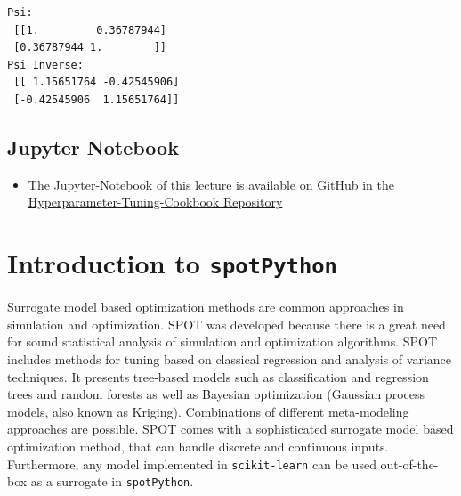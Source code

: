 \documentclass[
  letterpaper,
  DIV=11,
  numbers=noendperiod]{scrreprt}
\providecommand{\tightlist}{%
  \setlength{\itemsep}{0pt}\setlength{\parskip}{0pt}}\usepackage{longtable,booktabs,array}
\begin{document}
\begin{verbatim}
Psi:
 [[1.         0.36787944]
 [0.36787944 1.        ]]
Psi Inverse:
 [[ 1.15651764 -0.42545906]
 [-0.42545906  1.15651764]]
\end{verbatim}

\section{Jupyter Notebook}\label{jupyter-notebook-5}

\begin{tcolorbox}[enhanced jigsaw, left=2mm, opacitybacktitle=0.6, leftrule=.75mm, toptitle=1mm, opacityback=0, colback=white, rightrule=.15mm, colframe=quarto-callout-note-color-frame, title=\textcolor{quarto-callout-note-color}{\faInfo}\hspace{0.5em}{Note}, toprule=.15mm, coltitle=black, bottomrule=.15mm, bottomtitle=1mm, colbacktitle=quarto-callout-note-color!10!white, titlerule=0mm, breakable, arc=.35mm]

\begin{itemize}
\tightlist
\item
  The Jupyter-Notebook of this lecture is available on GitHub in the
  \href{https://github.com/sequential-parameter-optimization/Hyperparameter-Tuning-Cookbook/blob/main/006_num_gp.ipynb}{Hyperparameter-Tuning-Cookbook
  Repository}
\end{itemize}

\end{tcolorbox}

\chapter{\texorpdfstring{Introduction to
\texttt{spotPython}}{Introduction to spotPython}}\label{sec-spot}

Surrogate model based optimization methods are common approaches in
simulation and optimization. SPOT was developed because there is a great
need for sound statistical analysis of simulation and optimization
algorithms. SPOT includes methods for tuning based on classical
regression and analysis of variance techniques. It presents tree-based
models such as classification and regression trees and random forests as
well as Bayesian optimization (Gaussian process models, also known as
Kriging). Combinations of different meta-modeling approaches are
possible. SPOT comes with a sophisticated surrogate model based
optimization method, that can handle discrete and continuous inputs.
Furthermore, any model implemented in \texttt{scikit-learn} can be used
out-of-the-box as a surrogate in \texttt{spotPython}.
\end{document}

